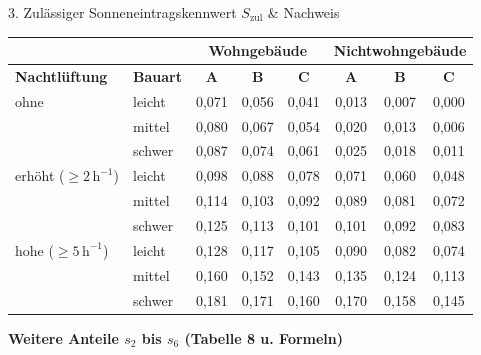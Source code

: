 \documentclass[11pt,a4paper]{article}
\begin{document}
{\begin{formelbox}{3. Zulässiger Sonneneintragskennwert $S_{\text{zul}}$ \& Nachweis}
    {\tiny
    \renewcommand{\arraystretch}{0.9}
    \setlength{\tabcolsep}{1.5pt}
    \begin{tabularx}{\linewidth}{|l|l|*{6}{c|}}
        \hline
        & & \multicolumn{3}{c}{\textbf{Wohngebäude}} & \multicolumn{3}{c}{\textbf{Nichtwohngebäude}} \\
        \hline
        \textbf{Nachtlüftung} & \textbf{Bauart} & \textbf{A} & \textbf{B} & \textbf{C} & \textbf{A} & \textbf{B} & \textbf{C} \\
        \hline
        ohne & leicht & 0,071 & 0,056 & 0,041 & 0,013 & 0,007 & 0,000 \\
        \hline
        & mittel & 0,080 & 0,067 & 0,054 & 0,020 & 0,013 & 0,006 \\
        \hline
        & schwer & 0,087 & 0,074 & 0,061 & 0,025 & 0,018 & 0,011 \\
        \hline
        erhöht ($\ge 2\,\text{h}^{-1}$) & leicht & 0,098 & 0,088 & 0,078 & 0,071 & 0,060 & 0,048 \\
        \hline
        & mittel & 0,114 & 0,103 & 0,092 & 0,089 & 0,081 & 0,072 \\
        \hline
        & schwer & 0,125 & 0,113 & 0,101 & 0,101 & 0,092 & 0,083 \\
        \hline
        hohe ($\ge 5\,\text{h}^{-1}$) & leicht & 0,128 & 0,117 & 0,105 & 0,090 & 0,082 & 0,074 \\
        \hline
        & mittel & 0,160 & 0,152 & 0,143 & 0,135 & 0,124 & 0,113 \\
        \hline
        & schwer & 0,181 & 0,171 & 0,160 & 0,170 & 0,158 & 0,145 \\
        \hline
    \end{tabularx}
    }

    \vspace{1.5mm}
    \textbf{\tiny Weitere Anteile $s_2$ bis $s_6$ (Tabelle 8 u. Formeln)}
    

\end{formelbox}}
\end{document}

